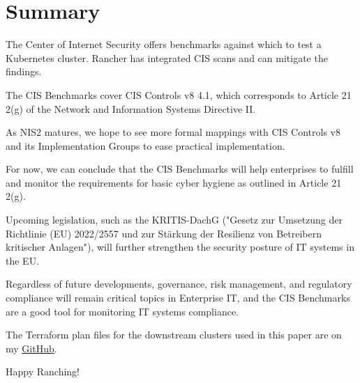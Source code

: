 %
%

\pagebreak
\section{Summary}

\onehalfspacing

The Center of Internet Security offers benchmarks against which to test a Kubernetes cluster. Rancher has integrated CIS scans and can mitigate the findings.

The CIS Benchmarks cover CIS Controls v8 4.1, which corresponds to Article 21 2(g) of the Network and Information Systems Directive II.

As NIS2 matures, we hope to see more formal mappings with CIS Controls v8 and its Implementation Groups to ease practical implementation.

For now, we can conclude that the CIS Benchmarks will help enterprises to fulfill and monitor the requirements for basic cyber hygiene as outlined in Article 21 2(g).

Upcoming legislation, such as the KRITIS-DachG ("Gesetz zur Umsetzung der Richtlinie (EU) 2022/2557 und zur Stärkung der Resilienz von Betreibern kritischer Anlagen"), will further strengthen the security posture of IT systems in the EU.

Regardless of future developments, governance, risk management, and regulatory compliance will remain critical topics in Enterprise IT, and the CIS Benchmarks are a good tool for monitoring IT systems compliance.

The Terraform plan files for the downstream clusters used in this paper are on my \href{https://github.com/chfrank-cgn/Rancher}{GitHub}.

Happy Ranching!

